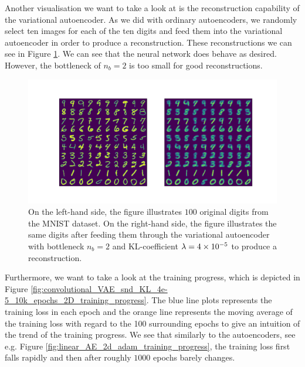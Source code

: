 Another visualisation we want to take a look at is the reconstruction capability of the variational autoencoder. As we did with ordinary autoencoders, we randomly select ten images for each of the ten digits and feed them into the variational autoencoder in order to produce a reconstruction. These reconstructions we can see in Figure \ref{fig:convolutional_VAE_snd_KL_4e-5_10k_epochs_2D_inference}. We can see that the neural network does behave as desired. However, the bottleneck of $n_b=2$ is too small for good reconstructions.

\begin{figure}
\begin{center}
      \includegraphics[trim = 15mm 10mm 15mm 15mm, clip, width=\linewidth]{convolutional_VAE_snd_KL_4e-5_10k_epochs_2D_inference}
\end{center}
\caption{On the left-hand side, the figure illustrates $100$ original digits from the MNIST dataset. On the right-hand side, the figure illustrates the same digits after feeding them through the variational autoencoder with bottleneck $n_b=2$ and KL-coefficient $\lambda = \num{4e-5}$ to produce a reconstruction.}\label{fig:convolutional_VAE_snd_KL_4e-5_10k_epochs_2D_inference}
\end{figure}


Furthermore, we want to take a look at the training progress, which is depicted in Figure \ref{fig:convolutional_VAE_snd_KL_4e-5_10k_epochs_2D_training_progress}. The blue line plots represents the training loss in each epoch and the orange line represents the moving average of the training loss with regard to the 100 surrounding epochs to give an intuition of the trend of the training progress. We see that similarly to the autoencoders, see e.g. Figure \ref{fig:linear_AE_2d_adam_training_progress}, the training loss first falls rapidly and then after roughly $1000$ epochs barely changes.

